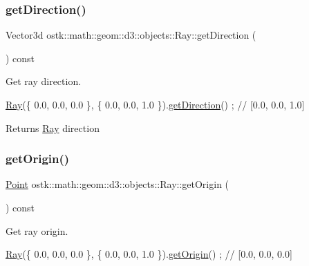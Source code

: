 \subsubsection{\texorpdfstring{get\+Direction()}{getDirection()}}
{\footnotesize\ttfamily Vector3d ostk\+::math\+::geom\+::d3\+::objects\+::\+Ray\+::get\+Direction (\begin{DoxyParamCaption}{ }\end{DoxyParamCaption}) const}



Get ray direction. 


\begin{DoxyCode}
\hyperlink{classostk_1_1math_1_1geom_1_1d3_1_1objects_1_1_ray_a78335698f8a4f72e613e607b13121df0}{Ray}(\{ 0.0, 0.0, 0.0 \}, \{ 0.0, 0.0, 1.0 \}).\hyperlink{classostk_1_1math_1_1geom_1_1d3_1_1objects_1_1_ray_a986aa3d13740b411f72115503b1c9a72}{getDirection}() ; \textcolor{comment}{// [0.0, 0.0, 1.0]}
\end{DoxyCode}


\begin{DoxyReturn}{Returns}
\hyperlink{classostk_1_1math_1_1geom_1_1d3_1_1objects_1_1_ray}{Ray} direction 
\end{DoxyReturn}
\mbox{\label{classostk_1_1math_1_1geom_1_1d3_1_1objects_1_1_ray_a8c47fac4d487986b538b8168484527c2}} 
\subsubsection{\texorpdfstring{get\+Origin()}{getOrigin()}}
{\footnotesize\ttfamily \hyperlink{classostk_1_1math_1_1geom_1_1d3_1_1objects_1_1_point}{Point} ostk\+::math\+::geom\+::d3\+::objects\+::\+Ray\+::get\+Origin (\begin{DoxyParamCaption}{ }\end{DoxyParamCaption}) const}



Get ray origin. 


\begin{DoxyCode}
\hyperlink{classostk_1_1math_1_1geom_1_1d3_1_1objects_1_1_ray_a78335698f8a4f72e613e607b13121df0}{Ray}(\{ 0.0, 0.0, 0.0 \}, \{ 0.0, 0.0, 1.0 \}).\hyperlink{classostk_1_1math_1_1geom_1_1d3_1_1objects_1_1_ray_a8c47fac4d487986b538b8168484527c2}{getOrigin}() ; \textcolor{comment}{// [0.0, 0.0, 0.0]}
\end{DoxyCode}


